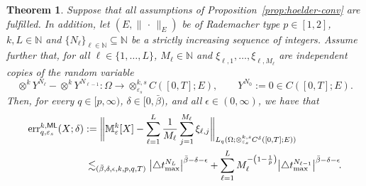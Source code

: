 \documentclass[reqno]{amsart}
\numberwithin{equation}{section}
\newcommand{\bbM}{\mathbb{M}}
\newcommand{\bbN}{\mathbb{N}}
\newcommand{\xk}{\otimes^k}
\newcommand{\xkseps}{\otimes^{k,s}_{\varepsilon_s}}
\newcommand{\Mk}{\bbM^k_\varepsilon}
\newcommand{\norm}[2]{     \| #1       \|_{ #2 }}
\newcommand{\from}{\colon}
\newcommand{\eps}{\varepsilon}
\newtheorem{theorem}[lemma]{Theorem}
\theoremstyle{remark}
\theoremstyle{definition}
\begin{document}
\begin{theorem}\label{thm:mlmc-hoelder} 
	Suppose that all assumptions 
	of Proposition~\ref{prop:hoelder-conv} 
	are fulfilled. 
	In addition, let
	$(E,\norm{\,\cdot\,}{E})$ be of 
	Rademacher type $p\in[1,2]$,  
	${k,L\in\bbN}$ 
	and ${\{N_\ell\}_{\ell\in\bbN}\subseteq\bbN}$ be a  
	strictly increasing sequence of integers. 
	Assume further that, 
	for all ${\ell\in\{1,\ldots,L\}}$, 
	$M_\ell\in\bbN$ and 
	$\xi_{\ell,1},\ldots,\xi_{\ell,M_\ell}$ 
	are independent 
	copies of the 
	random variable 
	\[
	\xk Y^{N_\ell} - \xk Y^{N_{\ell-1}} 
	\from  \Omega \to \xkseps C([0,T];E) , 
	\qquad 
	Y^{N_0} := 0 \in C([0,T];E). 
	\]
	Then, for every 
	${q\in[p,\infty)}$, 
	$\delta\in[0, \bar{\beta})$, 
	and all $\epsilon\in(0,\infty)$, 
	we have that 
	\begin{align*} 
	\mathrm{err}_{q, \eps_s}^{k,\sf ML} (X; \delta) 
	&:= 
	\biggl\| 
	\Mk[X] 
	-
	\sum_{\ell = 1}^{L} 
	\frac{1}{M_\ell} 
	\sum_{j=1}^{M_\ell}  
	\xi_{\ell,j}
	\biggr\|_{L_q(\Omega;\xkseps C^\delta([0,T];E))} 
	\\ 
	&\,\lesssim_{(\bar{\beta},\delta,\epsilon,k,p,q,T)} 
	\bigl| \triangle t^{N_L}_{\max} \bigr|^{\bar{\beta}-\delta-\epsilon} 
	+ 
	\sum_{\ell=1}^{L}   
	M_\ell^{-\left( 1-\frac{1}{p} \right)}  
	\bigl| \triangle t^{N_{\ell-1}}_{\max} \bigr|^{\bar{\beta}-\delta-\epsilon} \!. 
	\end{align*}
\end{theorem}
\end{document}

